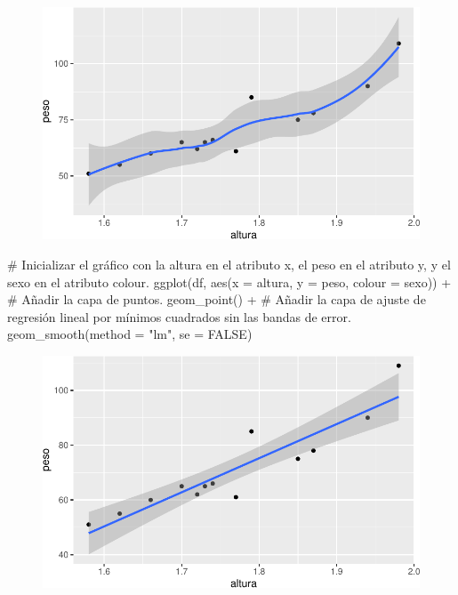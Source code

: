 \documentclass[
  a4paper,
]{scrreport}
\newenvironment{Shaded}{\begin{snugshade}}{\end{snugshade}}
\newcommand{\AttributeTok}[1]{\textcolor[rgb]{0.40,0.45,0.13}{#1}}
\newcommand{\CommentTok}[1]{\textcolor[rgb]{0.37,0.37,0.37}{#1}}
\newcommand{\ConstantTok}[1]{\textcolor[rgb]{0.56,0.35,0.01}{#1}}
\newcommand{\FunctionTok}[1]{\textcolor[rgb]{0.28,0.35,0.67}{#1}}
\newcommand{\NormalTok}[1]{\textcolor[rgb]{0.00,0.23,0.31}{#1}}
\newcommand{\SpecialCharTok}[1]{\textcolor[rgb]{0.37,0.37,0.37}{#1}}
\newcommand{\StringTok}[1]{\textcolor[rgb]{0.13,0.47,0.30}{#1}}
\theoremstyle{definition}
\theoremstyle{definition}
\theoremstyle{remark}
\begin{document}
\begin{figure}[H]

{\centering \includegraphics{./07-graficos_files/figure-pdf/unnamed-chunk-24-1.pdf}

}

\end{figure}

\begin{Shaded}
\begin{Highlighting}[]
\CommentTok{\# Inicializar el gráfico con la altura en el atributo x, el peso en el atributo y, y el sexo en el atributo colour.}
\FunctionTok{ggplot}\NormalTok{(df, }\FunctionTok{aes}\NormalTok{(}\AttributeTok{x =}\NormalTok{ altura, }\AttributeTok{y =}\NormalTok{ peso, }\AttributeTok{colour =}\NormalTok{ sexo)) }\SpecialCharTok{+}
\CommentTok{\# Añadir la capa de puntos.}
    \FunctionTok{geom\_point}\NormalTok{() }\SpecialCharTok{+}
\CommentTok{\# Añadir la capa de ajuste de regresión lineal por mínimos cuadrados sin las bandas de error.}
    \FunctionTok{geom\_smooth}\NormalTok{(}\AttributeTok{method =} \StringTok{"lm"}\NormalTok{, }\AttributeTok{se =} \ConstantTok{FALSE}\NormalTok{)}
\end{Highlighting}
\end{Shaded}

\begin{figure}[H]

{\centering \includegraphics{./07-graficos_files/figure-pdf/unnamed-chunk-25-1.pdf}

}

\end{figure}
\end{document}

